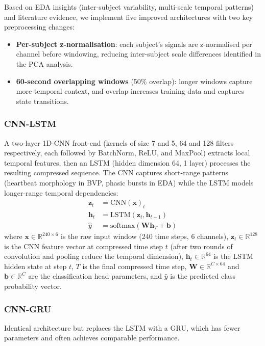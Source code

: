 \documentclass[11pt]{article}
\begin{document}
Based on EDA insights (inter-subject variability, multi-scale temporal patterns) and literature evidence, we implement five improved architectures with two key preprocessing changes:
\begin{itemize}    \item \textbf{Per-subject z-normalisation}: each subject's signals are z-normalised per channel before windowing, reducing inter-subject scale differences identified in the PCA analysis.
    \item \textbf{60-second overlapping windows} (50\% overlap): longer windows capture more temporal context, and overlap increases training data and captures state transitions.
\end{itemize}

\subsubsection{CNN-LSTM}
A two-layer 1D-CNN front-end (kernels of size 7 and 5, 64 and 128 filters respectively, each followed by BatchNorm, ReLU, and MaxPool) extracts local temporal features, then an LSTM (hidden dimension 64, 1 layer) processes the resulting compressed sequence.
The CNN captures short-range patterns (heartbeat morphology in BVP, phasic bursts in EDA) while the LSTM models longer-range temporal dependencies:
\begin{align}
\mathbf{z}_t &= \text{CNN}(\mathbf{x})_t \\
\mathbf{h}_t &= \text{LSTM}(\mathbf{z}_t, \mathbf{h}_{t-1}) \\
\hat{y} &= \text{softmax}(\mathbf{W} \mathbf{h}_T + \mathbf{b})
\end{align}
where $\mathbf{x} \in \mathbb{R}^{240 \times 6}$ is the raw input window (240 time steps, 6 channels), $\mathbf{z}_t \in \mathbb{R}^{128}$ is the CNN feature vector at compressed time step $t$ (after two rounds of convolution and pooling reduce the temporal dimension), $\mathbf{h}_t \in \mathbb{R}^{64}$ is the LSTM hidden state at step $t$, $T$ is the final compressed time step, $\mathbf{W} \in \mathbb{R}^{C \times 64}$ and $\mathbf{b} \in \mathbb{R}^C$ are the classification head parameters, and $\hat{y}$ is the predicted class probability vector.

\subsubsection{CNN-GRU}
Identical architecture but replaces the LSTM with a GRU, which has fewer parameters and often achieves comparable performance.
\end{document}
